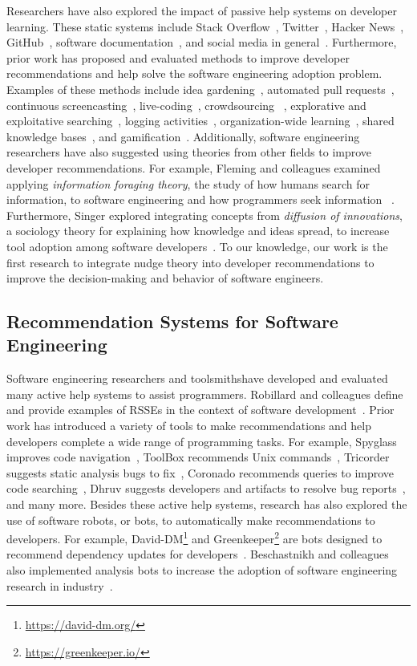 Researchers have also explored the impact of passive help systems on developer learning. These static systems include Stack Overflow~\cite{barua2014developers}, Twitter~\cite{singer2014twitter}, Hacker News~\cite{barik2015heart}, GitHub~\cite{dabbish2012social}, software documentation~\cite{Forward2002Documentation}, and social media in general~\cite{begel2010social}. Furthermore, prior work has proposed and evaluated methods to improve developer recommendations and help solve the software engineering adoption problem. Examples of these methods include idea gardening~\cite{CaoIdeaGarden}, automated pull requests~\cite{SamUgrade}, continuous screencasting~\cite{Murphy-HillScreencastingDiscovery}, live-coding~\cite{blackwell2014collaboration}, crowdsourcing ~\cite{gordon2015codepourri}, explorative and exploitative searching~\cite{karim2018learn}, logging activities~\cite{ToolBox}, organization-wide learning~\cite{OWL}, shared knowledge bases~\cite{Spyglass}, and gamification~\cite{barik2016game}. Additionally, software engineering researchers have also suggested using theories from other fields to improve developer recommendations. For example, Fleming and colleagues examined applying \textit{information foraging theory}, the study of how humans search for information, to software engineering and how programmers seek information ~\cite{fleming2013information}. Furthermore, Singer explored integrating concepts from \textit{diffusion of innovations}, a sociology theory for explaining how knowledge and ideas spread, to increase tool adoption among software developers~\cite{Diffusion}. To our knowledge, our work is the first research to integrate nudge theory into developer recommendations to improve the decision-making and behavior of software engineers.

\subsection{Recommendation Systems for Software Engineering} 

Software engineering researchers and toolsmithshave developed and evaluated many active help systems to assist programmers. Robillard and colleagues define and provide examples of RSSEs in the context of software development~\cite{RSSE}. Prior work has introduced a variety of tools to make recommendations and help developers complete a wide range of programming tasks. For example, Spyglass improves code navigation~\cite{Spyglass}, ToolBox recommends Unix commands~\cite{ToolBox}, Tricorder suggests static analysis bugs to fix~\cite{Tricorder}, Coronado recommends queries to improve code searching~\cite{Coronado}, Dhruv suggests developers and artifacts to resolve bug reports~\cite{Dhruv}, and many more. Besides these active help systems, research has also explored the use of software robots, or bots, to automatically make recommendations to developers. For example, David-DM\footnote{\url{https://david-dm.org/}} and Greenkeeper\footnote{\url{https://greenkeeper.io/}} are bots designed to recommend dependency updates for developers~\cite{sam2017autopullrequests}. Beschastnikh and colleagues also implemented analysis bots to increase the adoption of software engineering research in industry~\cite{beschastnikh2017accelerating}.

